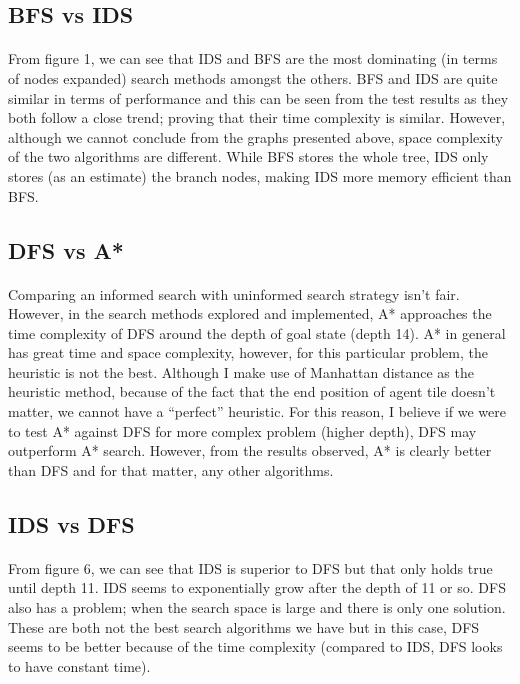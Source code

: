 \documentclass[10pt]{article}
\begin{document}
  \subsection{BFS vs IDS}
  \paragraph{} \indent
  From figure 1, we can see that IDS and BFS are the most dominating (in terms of nodes expanded) search methods amongst the others. BFS and IDS are quite similar in terms of performance and this can be seen from the test results as they both follow a close trend; proving that their time complexity is similar. However, although we cannot conclude from the graphs presented above, space complexity of the two algorithms are different. While BFS stores the whole tree, IDS only stores (as an estimate) the branch nodes, making IDS more memory efficient than BFS. 

  \subsection{DFS vs A*}
  \paragraph{} \indent
  Comparing an informed search with uninformed search strategy isn't fair. However, in the search methods explored and implemented, A* approaches the time complexity of DFS around the depth of goal state (depth 14). A* in general has great time and space complexity, however, for this particular problem, the heuristic is not the best. Although I make use of Manhattan distance as the heuristic method, because of the fact that the end position of agent tile doesn’t matter, we cannot have a ``perfect'' heuristic. For this reason, I believe if we were to test A* against DFS for more complex problem (higher depth), DFS may outperform A* search. However,
  from the results observed, A* is clearly better than DFS and for that matter, any other algorithms.

  \subsection{IDS vs DFS}
  \paragraph{} \indent
  From figure 6, we can see that IDS is superior to DFS but that only holds true until depth 11. IDS seems to exponentially grow after the depth of 11 or so. DFS also has a problem; when the search space is large and there is only one solution. These are both not the best search algorithms we have but in this case, DFS seems to be better because of the time complexity (compared to IDS, DFS looks to have constant time).  
\end{document}
